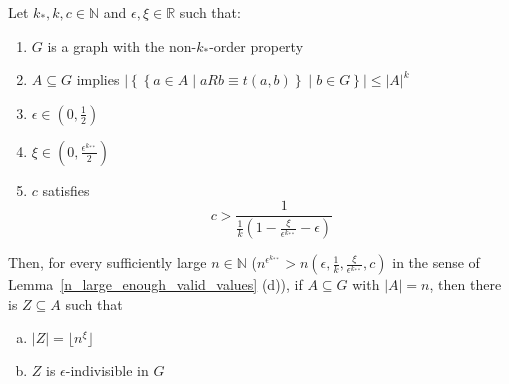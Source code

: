     \lemma[Claim 4.21]\label{many_values_to_equitative_partition_with_bound_exceptional_pairs}
        Let $k_*, k, c \in \mathbb{N}$ and $\epsilon, \xi \in \mathbb{R}$ such that:
        \begin{enumerate}
            \item\label{itm:4.21.1} $G$ is a graph with the non-$k_*$-order property
            \item\label{itm:4.21.2} $A \subseteq G$ implies $|\left\{ \left\{ a \in A \mid a R b \equiv t(a,b) \right\} \mid b \in G \right\}|
                \leq |A|^k$
            \item\label{itm:4.21.3} $\epsilon \in \left(0, \frac{1}{2}\right)$
            \item\label{itm:4.21.4} $\xi \in \left(0, \frac{\epsilon^{k_{**}}}{2} \right)$
            \item\label{itm:4.21.5} $c$ satisfies \[
                c > \frac{1}{\frac{1}{k} (1 - \frac{\xi}{\epsilon^{k_{**}}} - \epsilon)}
            \]
        \end{enumerate}
        Then, for every sufficiently large $n \in \mathbb{N}$ ($n^{\epsilon^{k_{**}}} > n\left( \epsilon, \frac{1}{k},
            \frac{\xi}{\epsilon^{k_{**}}}, c \right)$ in the sense of Lemma~\ref{n_large_enough_valid_values} (d)), if
            $A \subseteq G$ with $|A| = n$, then there is $Z \subseteq A$ such that
        \begin{enumerate}[(a)]
            \item\label{itm:4.21.a} $|Z| = \lfloor n^\xi \rfloor$
            \item\label{itm:4.21.b} $Z$ is $\epsilon$-indivisible in $G$
        \end{enumerate}

